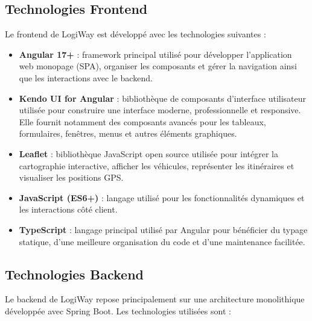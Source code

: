 \documentclass[12pt,a4paper]{report}
\begin{document}
\subsection{Technologies Frontend}

Le frontend de LogiWay est développé avec les technologies suivantes :

\begin{itemize}
    \item \textbf{Angular 17+} : framework principal utilisé pour développer
    l'application web monopage (SPA), organiser les composants et gérer la
    navigation ainsi que les interactions avec le backend.

    \item \textbf{Kendo UI for Angular} : bibliothèque de composants
    d'interface utilisateur utilisée pour construire une interface moderne,
    professionnelle et responsive. Elle fournit notamment des composants
    avancés pour les tableaux, formulaires, fenêtres, menus et autres éléments
    graphiques.

    \item \textbf{Leaflet} : bibliothèque JavaScript open source utilisée pour
    intégrer la cartographie interactive, afficher les véhicules, représenter
    les itinéraires et visualiser les positions GPS.

    \item \textbf{JavaScript (ES6+)} : langage utilisé pour les fonctionnalités
    dynamiques et les interactions côté client.

    \item \textbf{TypeScript} : langage principal utilisé par Angular pour
    bénéficier du typage statique, d'une meilleure organisation du code et
    d'une maintenance facilitée.
\end{itemize}

\subsection{Technologies Backend}

Le backend de LogiWay repose principalement sur une architecture monolithique
développée avec Spring Boot. Les technologies utilisées sont :
\end{document}
